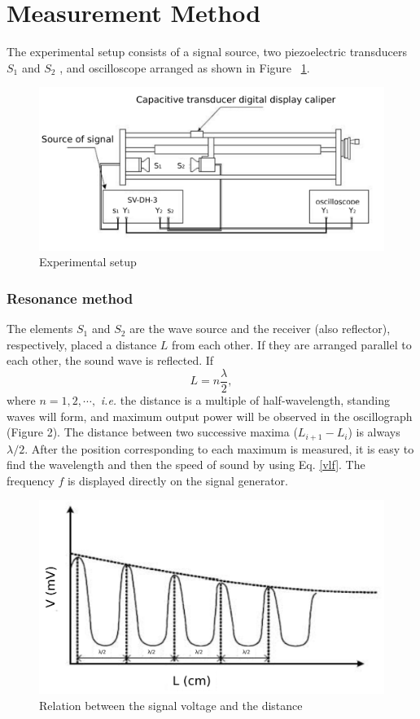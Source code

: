 \section{Measurement Method}

The experimental setup consists of a signal source, two piezoelectric
transducers $S_1$ and $S_2$ , and oscilloscope arranged as shown in Figure~
\ref{app}.

\begin{figure}[H]
    \centering
    \includegraphics[width=12cm]{fig/es1}
    \caption{Experimental setup}\label{app}
\end{figure}


\subsubsection{Resonance method}

The elements $S_1$ and $S_2$ are the wave source and the receiver (also
reflector), respectively, placed a distance $L$ from each other. If they are
arranged parallel to each other, the sound wave is reflected. If 
\begin{equation}
    L=n\frac{\lambda}{2},
    \label{equ_res}
\end{equation}
where $n=1,2,\cdots,$ \emph{i.e.} the distance is a multiple of
half-wavelength, standing waves will form, and maximum output power will be
observed in the oscillograph (Figure 2). The distance between two successive
maxima ($L_{i+1} - L_i$) is always $\lambda/2$. After the position
corresponding to each maximum is measured, it is easy to find the wavelength
and then the speed of sound by using Eq. \ref{vlf}. The frequency $f$ is
displayed directly on the signal generator. 

\begin{figure}[h]
        \centering
        \includegraphics[width=12cm]{fig/r}
        \caption{Relation between the signal voltage and the distance}\label{vL}
\end{figure}


